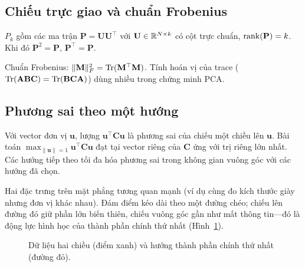\subsection{Chiếu trực giao và chuẩn Frobenius}

\begin{definition}
$P_k$ gồm các ma trận $\mathbf{P} = \mathbf{U}\mathbf{U}^\top$ với $\mathbf{U} \in \mathbb{R}^{N \times k}$ có cột trực chuẩn, $\mathrm{rank}(\mathbf{P}) = k$. Khi đó $\mathbf{P}^2 = \mathbf{P}$, $\mathbf{P}^\top = \mathbf{P}$.
\end{definition}

Chuẩn Frobenius: $\|\mathbf{M}\|_F^2 = \mathrm{Tr}(\mathbf{M}^\top\mathbf{M})$. Tính hoán vị của trace ($\mathrm{Tr}(\mathbf{A}\mathbf{B}\mathbf{C}) = \mathrm{Tr}(\mathbf{B}\mathbf{C}\mathbf{A})$) dùng nhiều trong chứng minh PCA.

\subsection{Phương sai theo một hướng}

Với vector đơn vị $\mathbf{u}$, lượng $\mathbf{u}^\top\mathbf{C}\mathbf{u}$ là phương sai của chiếu một chiều lên $\mathbf{u}$. Bài toán $\max_{\|\mathbf{u}\|=1} \mathbf{u}^\top\mathbf{C}\mathbf{u}$ đạt tại vector riêng của $\mathbf{C}$ ứng với trị riêng lớn nhất. Các hướng tiếp theo tối đa hóa phương sai trong không gian vuông góc với các hướng đã chọn.

\begin{example}
Hai đặc trưng trên mặt phẳng tương quan mạnh (ví dụ cùng đo kích thước giày nhưng đơn vị khác nhau). Đám điểm kéo dài theo một đường chéo; chiếu lên đường đó giữ phần lớn biến thiên, chiếu vuông góc gần như mất thông tin---đó là động lực hình học của thành phần chính thứ nhất (Hình~\ref{fig:pca-shoe}).
\end{example}

\begin{figure}[H]
\centering
{}
\caption{Dữ liệu hai chiều (điểm xanh) và hướng thành phần chính thứ nhất (đường đỏ).}
\label{fig:pca-shoe}
\end{figure}

